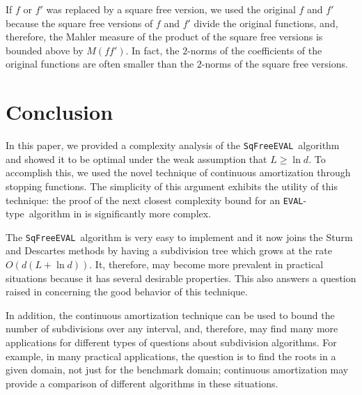 \documentclass{amsart}
\theoremstyle{definition}
\newcommand{\EVAL}{\texttt{SqFreeEVAL}}
\newcommand{\EVALTYPE}{\texttt{EVAL}-type}
\begin{document}
If $f$ or $f'$ was replaced by a square free version, we used the original $f$ and $f'$ because the square free versions of $f$ and $f'$ divide the original functions, and, therefore, the Mahler measure of the product of the square free versions is bounded above by $M(ff')$.  In fact, the $2$-norms of the coefficients of the original functions are often smaller than the $2$-norms of the square free versions.
\section{Conclusion}\label{Conc}
In this paper, we provided a complexity analysis of the \EVAL\ algorithm and showed it to be optimal under the weak assumption that $L\geq \ln d$.  To accomplish this, we used the novel technique of continuous amortization through stopping functions.  The simplicity of this argument exhibits the utility of this technique: the proof of the next closest complexity bound for an \EVALTYPE\ algorithm in \citep{sagraloff-yap:ceval:09} is significantly more complex.

The \EVAL\ algorithm is very easy to implement \citep{moore:bk,mitchell:robust-ray:90,plantinga-vegter:isotopic:04,plantinga:thesis:06,kamath:subdivision:10} and it now joins the Sturm and Descartes methods by having a subdivision tree which grows at the rate $O(d(L+\ln d))$.  It, therefore, may become more prevalent in practical situations because it has several desirable properties.  This also answers a question raised in \citep{Henrici:search:70} concerning the good behavior of this technique.

In addition, the continuous amortization technique can be used to bound the number of subdivisions over any interval, and, therefore, may find many more applications for different types of questions about subdivision algorithms.  For example, in many practical applications, the question is to find the roots in a given domain, not just for the benchmark domain; continuous amortization may provide a comparison of different algorithms in these situations.
\end{document}
